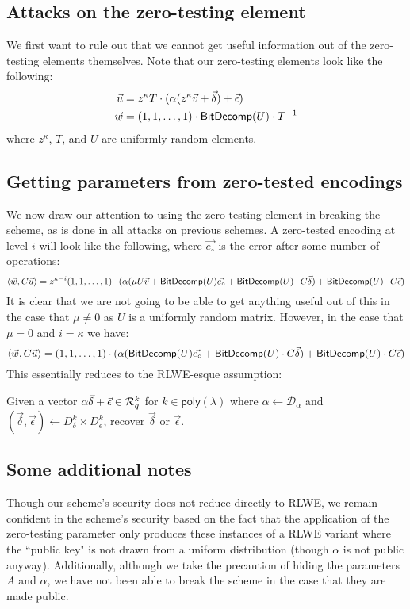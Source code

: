 \subsection{Attacks on the zero-testing element}

We first want to rule out that we cannot get useful information out of the zero-testing elements themselves.  Note that our zero-testing elements look like the following:
\begin{align*}
\vec{u} &= z^\kappa T\cdot (\alpha (z^\kappa \vec{v} + \vec{\delta}) + \vec{\epsilon})\\
\vec{w} &= (1,1,\ldots, 1)\cdot\mathsf{BitDecomp}(U)\cdot T^{-1}
\end{align*}
where $z^\kappa$, $T$, and $U$ are uniformly random elements.

\subsection{Getting parameters from zero-tested encodings}

We now draw our attention to using the zero-testing element in breaking the scheme, as is done in all attacks on previous schemes.  A zero-tested encoding at level-$i$ will look like the following, where $\vec{e_{\circ}}$ is the error after some number of operations:
$$\left<\vec{w}, C \vec{u}\right> = z^{\kappa-i} (1,1,\ldots, 1)\cdot(\alpha (\mu U \vec{v} + \mathsf{BitDecomp}(U)\vec{e_{\circ}} + \mathsf{BitDecomp}(U)\cdot C\vec{\delta}) + \mathsf{BitDecomp}(U)\cdot C\vec{\epsilon})$$
It is clear that we are not going to be able to get anything useful out of this in the case that $\mu \not= 0$ as $U$ is a uniformly random matrix.  However, in the case that $\mu = 0$ and $i = \kappa$ we have:
\begin{equation}\label{eq:topleveltested}
\left<\vec{w}, C \vec{u}\right> = (1,1,\ldots,1)\cdot(\alpha (\mathsf{BitDecomp}(U)\vec{e_{\circ}} + \mathsf{BitDecomp}(U)\cdot C\vec{\delta}) + \mathsf{BitDecomp}(U)\cdot C\vec{\epsilon})
\end{equation}
This essentially reduces to the RLWE-esque assumption:
\begin{assumption}
\label{rlwevar}
Given a vector $\alpha\vec{\delta} + \vec{\epsilon} \in \mathcal{R}_q^k$ for $k \in \mathsf{poly}(\lambda)$ where $\alpha \leftarrow \mathcal{D}_\alpha$ and $(\vec{\delta}, \vec{\epsilon}) \leftarrow D_\delta^k \times D_\epsilon^k$, recover $\vec{\delta}$ or $\vec{\epsilon}$.
\end{assumption}

\subsection{Some additional notes}

Though our scheme's security does not reduce directly to RLWE, we remain confident in the scheme's security based on the fact that the application of the zero-testing parameter only produces these instances of a RLWE variant where the ``public key" is not drawn from a uniform distribution (though $\alpha$ is not public anyway).  Additionally, although we take the precaution of hiding the parameters $A$ and $\alpha$, we have not been able to break the scheme in the case that they are made public. 

